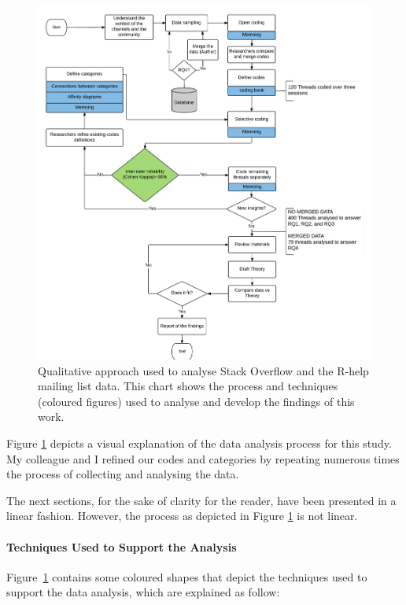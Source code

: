 \documentclass{sig-alternate-05-2015}
\begin{document}
	\begin{figure} [!htb]
		\centering
		\includegraphics[width=1\columnwidth]{Figures/ContentAnalysisFlow_3}
		\caption[Our content analysis method]{Qualitative approach used to analyse Stack Overflow and the R-help mailing list data. This chart shows the process and techniques (coloured figures) used to analyse and develop the findings of this work.}
		\label{fig:ContentAnalysisFlow}
	\end{figure}

	Figure \ref{fig:ContentAnalysisFlow} depicts a visual explanation of the data analysis process for this study.
	My colleague and I refined our codes and categories by repeating numerous times the process of collecting and analysing the data.

	The next sections, for the sake of clarity for the reader, have been presented in a linear fashion. 
	However, the process as depicted in Figure \ref{fig:ContentAnalysisFlow} is not linear. 

\paragraph{Techniques Used to Support the Analysis}
	Figure~\ref{fig:ContentAnalysisFlow} contains some coloured shapes that depict the techniques used to support the data analysis, which are explained as follow:
\end{document}

